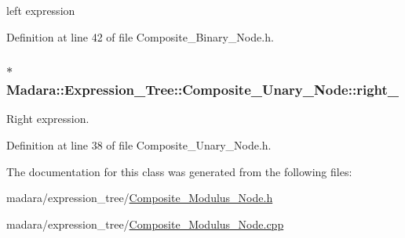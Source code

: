 left expression 



Definition at line 42 of file Composite\_\-Binary\_\-Node.h.

\hypertarget{classMadara_1_1Expression__Tree_1_1Composite__Unary__Node_a077b7bd1b52df6f5c6adfde735556a68}{
\subsubsection[{right\_\-}]{$\ast$ {\bf Madara::Expression\_\-Tree::Composite\_\-Unary\_\-Node::right\_\-}}}
\label{d3/dc7/classMadara_1_1Expression__Tree_1_1Composite__Unary__Node_a077b7bd1b52df6f5c6adfde735556a68}


Right expression. 



Definition at line 38 of file Composite\_\-Unary\_\-Node.h.



The documentation for this class was generated from the following files:\begin{DoxyCompactItemize}
\item 
madara/expression\_\-tree/\hyperlink{Composite__Modulus__Node_8h}{Composite\_\-Modulus\_\-Node.h}\item 
madara/expression\_\-tree/\hyperlink{Composite__Modulus__Node_8cpp}{Composite\_\-Modulus\_\-Node.cpp}\end{DoxyCompactItemize}
